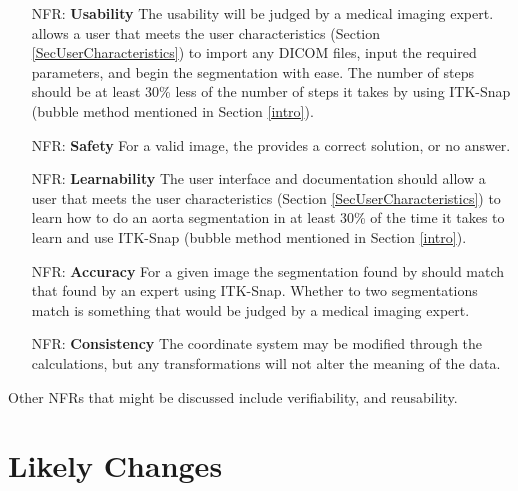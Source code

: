 \documentclass[12pt]{article}
\newcounter{nfrnum} %
\begin{document}
\noindent \begin{itemize}

\item[NFR\refstepcounter{nfrnum}\thenfrnum \label{NFR_GUI}:] \textbf{Usability}
The usability will be judged by a medical imaging expert. \progname{} allows a user that meets the user characteristics (Section \ref{SecUserCharacteristics})  to import any DICOM files, input the required parameters, and begin the segmentation with ease. The number of steps should be at least 30\% less of the number of steps it takes by using ITK-Snap  (bubble method mentioned in Section \ref{intro}).

\item[NFR\refstepcounter{nfrnum}\thenfrnum \label{NFR_Safety}:] \textbf{Safety}
For a valid image, the \progname{} provides a correct solution, or no answer.

\item[NFR\refstepcounter{nfrnum}\thenfrnum \label{NFR_Learnability}:] \textbf{Learnability}
The user interface and documentation should allow a user that meets the user characteristics (Section \ref{SecUserCharacteristics}) to learn how to do an aorta segmentation in at least 30\% of the time it takes to learn and use ITK-Snap (bubble method mentioned in Section \ref{intro}).

\item[NFR\refstepcounter{nfrnum}\thenfrnum \label{NFR_Accuracy}:] \textbf{Accuracy}
For a given image the segmentation found by \progname{} should match that found by an expert using ITK-Snap. Whether to two segmentations match is something that would be judged by a medical imaging expert.

\item[NFR\refstepcounter{nfrnum}\thenfrnum \label{NFR_Consistency}:] \textbf{Consistency}
The coordinate system may be modified through the calculations, but any transformations will not alter the meaning of the data.


\end{itemize}


\noindent Other NFRs that might be discussed include verifiability, and reusability.

\section{Likely Changes}    
\end{document}
